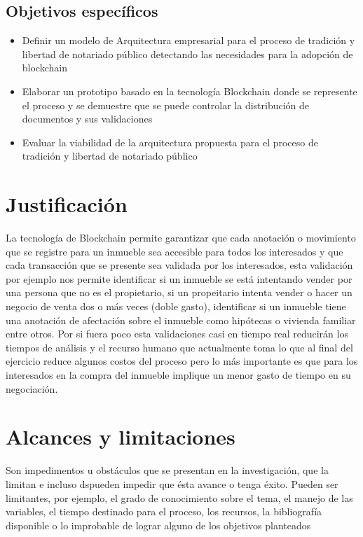 \subsection{Objetivos específicos}
\begin{itemize}

\item Definir un modelo de Arquitectura empresarial para el proceso de tradición y libertad de notariado público detectando las necesidades para la adopción de blockchain

\item Elaborar un prototipo basado en la tecnología Blockchain donde se represente el proceso y se demuestre que se puede controlar la distribución de documentos y sus validaciones

\item Evaluar la viabilidad de la arquitectura propuesta para el proceso de tradición y libertad de notariado público
\end{itemize}

\section{Justificación}

 La tecnología de Blockchain permite garantizar que cada anotación o movimiento que se registre para un inmueble sea accesible para todos los interesados y que cada transacción que se presente sea validada por los interesados, esta validación por ejemplo nos permite identificar si un inmueble se está intentando vender por una persona que no es el propietario, si un propeitario intenta vender o hacer un negocio de venta dos o más veces (doble gasto), identificar si un inmueble tiene una anotación de afectación sobre el inmueble como hipótecas o vivienda familiar entre otros. Por si fuera poco esta validaciones casi en tiempo real reducirán los tiempos de análisis y el recurso humano que actualmente toma lo que al final del ejercicio reduce algunos costos del proceso pero lo más importante es que para los interesados en la compra del inmueble implique un menor gasto de tiempo en su negociación.

\section{Alcances y limitaciones}

Son impedimentos u obstáculos que se presentan en la investigación, que la
limitan e incluso dspueden impedir que ésta avance o tenga éxito. Pueden ser
limitantes, por ejemplo, el grado de conocimiento sobre el tema, el manejo de las
variables, el tiempo destinado para el proceso, los recursos, la bibliografía
disponible o lo improbable de lograr alguno de los objetivos planteados
